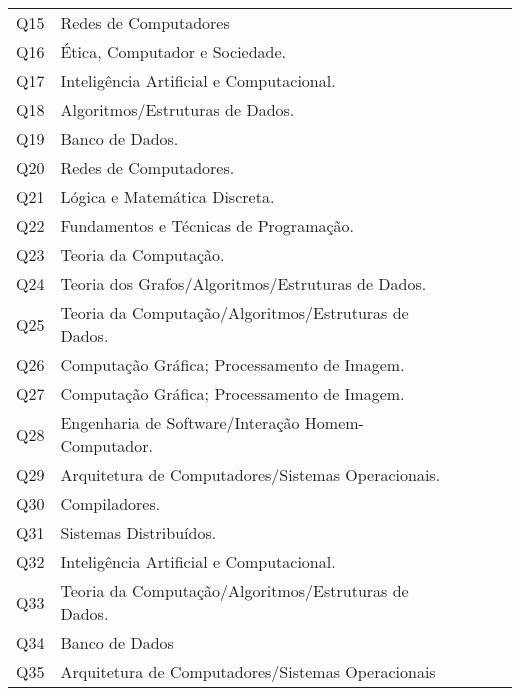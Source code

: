 \documentclass[12pt]{article}
\begin{document}
\begin{table}[]
\begin{tabular}{c|l|c|c|c}
  Q15       & Redes de Computadores                                &             &           &      \\
  Q16       & Ética, Computador e Sociedade.                       &             &           &      \\
  Q17       & Inteligência Artificial e Computacional.             &             &           &      \\
  Q18       & Algoritmos/Estruturas de Dados.                      &             &           &       \\
  Q19       & Banco de Dados.                                      &             &           &       \\
  Q20       & Redes de Computadores.                               &             &           &      \\
  Q21       & Lógica e Matemática Discreta.                        &             &           &       \\
  Q22       & Fundamentos e Técnicas de Programação.               &             &           &    \\
  Q23       & Teoria da Computação.                                &             &           &     \\
  Q24       & Teoria dos Grafos/Algoritmos/Estruturas de Dados.    &             &           &     \\
  Q25       & Teoria da Computação/Algoritmos/Estruturas de Dados. &             &           &     \\
  Q26       & Computação Gráfica; Processamento de Imagem.         &             &           &     \\
  Q27       & Computação Gráfica; Processamento de Imagem.         &             &           &    \\
  Q28       & Engenharia de Software/Interação Homem-Computador.   &             &           &    \\
  Q29       & Arquitetura de Computadores/Sistemas Operacionais.   &             &           &     \\
  Q30       & Compiladores.                                        &             &           &   \\
  Q31       & Sistemas Distribuídos.                               &             &           &    \\
  Q32       & Inteligência Artificial e Computacional.             &             &           &    \\
  Q33       & Teoria da Computação/Algoritmos/Estruturas de Dados. &             &           &     \\
  Q34       & Banco de Dados                                       &             &           &     \\
  Q35       & Arquitetura de Computadores/Sistemas Operacionais    &             &           &    \\
\hline\hline
\end{tabular}
\end{table}
\vskip0.3cm
\end{document}
